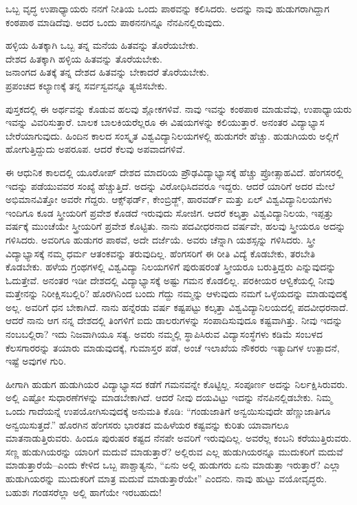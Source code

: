 ಒಬ್ಬ ವೃದ್ಧ ಉಪಾಧ್ಯಾಯರು ನನಗೆ ನೀತಿಯ ಒಂದು ಪಾಠವನ್ನು ಕಲಿಸಿದರು. ಅದನ್ನು ನಾವು ಹುಡುಗರಾಗಿದ್ದಾಗ ಕಂಠಪಾಠ ಮಾಡಿದೆವು. ಅದರ ಒಂದು ಪಾಠ\break ನನಗಿನ್ನೂ ನೆನಪಿನಲ್ಲಿರುವುದು.

\begin{myquote}
ಹಳ್ಳಿಯ ಹಿತಕ್ಕಾಗಿ ಒಬ್ಬ ತನ್ನ ಮನೆಯ ಹಿತವನ್ನು ತೊರೆಯಬೇಕು.\\ದೇಶದ ಹಿತಕ್ಕಾಗಿ ಹಳ್ಳಿಯ ಹಿತವನ್ನು ತೊರೆಯಬೇಕು.\\ಜನಾಂಗದ ಹಿತಕ್ಕೆ ತನ್ನ ದೇಶದ ಹಿತವನ್ನು ಬೇಕಾದರೆ ತೊರೆಯಬೇಕು.\\ಪ್ರಪಂಚದ ಕಲ್ಯಾಣಕ್ಕೆ ತನ್ನ ಸರ್ವಸ್ವವನ್ನೂ ತ್ಯಜಿಸಬೇಕು.
\end{myquote}

ಪುಸ್ತಕದಲ್ಲಿ ಈ ಅರ್ಥವನ್ನು ಕೊಡುವ ಹಲವು ಶ್ಲೋಕಗಳಿವೆ. ನಾವು ಇವನ್ನು ಕಂಠಪಾಠ ಮಾಡುವೆವು, ಉಪಾಧ್ಯಾಯರು ಇವನ್ನು ವಿವರಿಸುತ್ತಾರೆ. ಬಾಲಕ ಬಾಲಕಿಯರೆಲ್ಲರೂ ಈ ವಿಷಯಗಳನ್ನು ಕಲಿಯುತ್ತಾರೆ. ಅನಂತರ ವಿದ್ಯಾಭ್ಯಾಸ ಬೇರೆಯಾಗುವುದು. ಹಿಂದಿನ ಕಾಲದ ಸಂಸ್ಕೃತ ವಿಶ್ವವಿದ್ಯಾನಿಲಯಗಳಲ್ಲಿ ಹುಡುಗರೇ ಹೆಚ್ಚು. ಹುಡುಗಿಯರು ಅಲ್ಲಿಗೆ ಹೋಗುತ್ತಿದ್ದುದು ಅಪರೂಪ. ಆದರೆ ಕೆಲವು ಅಪವಾದಗಳಿವೆ.

ಈ ಆಧುನಿಕ ಕಾಲದಲ್ಲಿ ಯೂರೋಪ್​ ದೇಶದ ಮಾದರಿಯ ಪ್ರೌಢವಿದ್ಯಾಭ್ಯಾಸಕ್ಕೆ \break ಹೆಚ್ಚು ಪ್ರೋತ್ಸಾಹವಿದೆ. ಹೆಂಗಸರಲ್ಲಿ ಇದನ್ನು ಪಡೆಯುವವರ ಸಂಖ್ಯೆ ಹೆಚ್ಚುತ್ತಿದೆ. ಅದನ್ನು ವಿರೋಧಿಸಿದವರೂ ಇದ್ದರು. ಆದರೆ ಯಾರಿಗೆ ಅದರ ಮೇಲೆ ಅಭಿಮಾನವಿತ್ತೋ ಅವರೇ ಗೆದ್ದರು. ಆಕ್ಸ್​ಫರ್ಡ್​, ಕೇಂಬ್ರಿಡ್ಜ್​, ಹಾರವರ್ಡ್​ ಮತ್ತು ಏಲ್​ ವಿಶ್ವವಿದ್ಯಾನಿಲಯಗಳು ಇಂದಿಗೂ ಕೂಡ ಸ್ತ್ರೀಯರಿಗೆ ಪ್ರವೇಶ ಕೊಡದೆ ಇರುವುದು ಸೋಜಿಗ. ಆದರೆ ಕಲ್ಕತ್ತಾ ವಿಶ್ವವಿದ್ಯಾನಿಲಯ, ಇಪ್ಪತ್ತು ವರ್ಷಕ್ಕೆ ಮುಂಚೆಯೇ ಸ್ತ್ರೀಯರಿಗೆ ಪ್ರವೇಶ ಕೊಟ್ಟಿತು. ನಾನು ಪದವೀಧರನಾದ ವರ್ಷವೇ, ಹಲವು ಸ್ತ್ರೀಯರೂ ಅದನ್ನು ಗಳಿಸಿದರು. ಅವರಿಗೂ ಹುಡುಗರ ಪಾಠವೆ, ಅದೇ ದರ್ಜೆಯೆ. ಅವರು ಚೆನ್ನಾಗಿ ಯಶಸ್ಸನ್ನು ಗಳಿಸಿದರು. ಸ್ತ್ರೀ ವಿದ್ಯಾಭ್ಯಾಸಕ್ಕೆ ನಮ್ಮ ಧರ್ಮ ಆತಂಕವನ್ನು ತರುವುದಿಲ್ಲ. ಹೆಂಗಸರಿಗೆ ಈ ರೀತಿ ವಿದ್ಯೆ ಕೊಡಬೇಕು, ತರಬೇತಿ ಕೊಡಬೇಕು. ಹಳೆಯ ಗ್ರಂಥಗಳಲ್ಲಿ ವಿಶ್ವವಿದ್ಯಾ ನಿಲಯಗಳಿಗೆ ಪುರುಷರಂತೆ ಸ್ತ್ರೀಯರೂ ಬರುತ್ತಿದ್ದರು ಎನ್ನುವುದನ್ನು ಓದುತ್ತೇವೆ. ಅನಂತರ ಇಡೀ ದೇಶದಲ್ಲಿ ವಿದ್ಯಾಭ್ಯಾಸಕ್ಕೆ ಅಷ್ಟು ಗಮನ ಕೊಡಲಿಲ್ಲ. ಪರಕೀಯರ ಆಳ್ವಿಕೆಯಲ್ಲಿ ನೀವು ಮತ್ತೇನನ್ನು ನಿರೀಕ್ಷಿಸಬಲ್ಲಿರಿ? ಹೊರಗಿನಿಂದ ಬಂದು ಗೆದ್ದು ನಮ್ಮನ್ನು ಆಳುವುದು ನಮಗೆ ಒಳ್ಳೆಯದನ್ನು ಮಾಡುವುದಕ್ಕೆ ಅಲ್ಲ. ಅವರಿಗೆ ಧನ ಬೇಕಾಗಿದೆ. ನಾನು ಹನ್ನೆರಡು ವರ್ಷ ಕಷ್ಟಪಟ್ಟು ಕಲ್ಕತ್ತಾ ವಿಶ್ವವಿದ್ಯಾನಿಲಯದಲ್ಲಿ ಪದವೀಧರನಾದೆ. ಆದರೆ ನಾನು ಆಗ ನನ್ನ ದೇಶದಲ್ಲಿ ತಿಂಗಳಿಗೆ ಐದು ಡಾಲರುಗಳನ್ನು ಸಂಪಾದಿಸುವುದೂ ಕಷ್ಟವಾಗಿತ್ತು. ನೀವು ಇದನ್ನು ನಂಬಬಲ್ಲಿರಾ? ಇದು ನಿಜವಾಗಿಯೂ ಸತ್ಯ. ಅವರು ನಮ್ಮಲ್ಲಿ ಸ್ಥಾಪಿಸಿರುವ ವಿದ್ಯಾಸಂಸ್ಥೆಗಳು ಕಡಿಮೆ ಸಂಬಳದ ಕೆಲಸಗಾರರನ್ನು ತಯಾರು ಮಾಡುವುದಕ್ಕೆ, ಗುಮಾಸ್ತರ ಪಡೆ, ಅಂಚೆ ಇಲಾಖೆಯ ನೌಕರರು ಇತ್ಯಾದಿಗಳ ಉತ್ಪಾದನೆ, ಇಷ್ಟೆ ಅವುಗಳ ಗುರಿ.

ಹೀಗಾಗಿ ಹುಡುಗ ಹುಡುಗಿಯರ ವಿದ್ಯಾಭ್ಯಾಸದ ಕಡೆಗೆ ಗಮನವನ್ನೇ ಕೊಟ್ಟಿಲ್ಲ. ಸಂಪೂರ್ಣ ಅದನ್ನು ನಿರ್ಲಕ್ಷಿಸಿರುವರು. ಅಲ್ಲಿ ಎಷ್ಟೋ ಸುಧಾರಣೆಗಳನ್ನು ಮಾಡಬೇಕಾಗಿದೆ. ಆದರೆ ನೀವು ದಯವಿಟ್ಟು ಇದನ್ನು ನೆನಪಿನಲ್ಲಿಡಬೇಕು. ನಿಮ್ಮ ಒಂದು ಗಾದೆಯನ್ನೆ ಉಪಯೋಗಿಸುವುದಕ್ಕೆ ಅನುಮತಿ ಕೊಡಿ: “ಗಂಡುಜಾತಿಗೆ ಅನ್ವಯಿಸುವುದೇ ಹೆಣ್ಣುಜಾತಿಗೂ ಅನ್ವಯಿಸುತ್ತದೆ.” ಹೊರಗಿನ ಹೆಂಗಸರು ಭಾರತದ ಮಹಿಳೆಯರ ಕಷ್ಟವನ್ನು ಕುರಿತು ಯಾವಾಗಲೂ ಮಾತನಾಡುತ್ತಿರುವರು. ಹಿಂದೂ ಪುರುಷರ ಕಷ್ಟದ ನೆನಪೇ ಅವರಿಗೆ ಇರುವುದಿಲ್ಲ. ಅವರೆಲ್ಲ ಕಂಬನಿ ಕರೆಯುತ್ತಿರುವರು. ಸಣ್ಣ ಹುಡುಗಿಯರನ್ನು ಯಾರಿಗೆ ಮದುವೆ ಮಾಡುತ್ತಾರೆ? ಅಲ್ಲಿರುವ ಎಲ್ಲ ಹುಡುಗಿಯರನ್ನೂ ಮುದುಕರಿಗೆ ಮದುವೆ ಮಾಡುತ್ತಾರೆಯೆ–ಎಂದು ಕೇಳಿದ ಒಬ್ಬ ಪಾಶ್ಚಾತ್ಯನು, “ಏನು ಅಲ್ಲಿ ಹುಡುಗರು ಏನು ಮಾಡುತ್ತಾ ಇರುತ್ತಾರೆ? ಎಲ್ಲಾ ಹುಡುಗಿಯರನ್ನು ಮುದುಕರಿಗೆ ಮಾತ್ರ ಮದುವೆ ಮಾಡುತ್ತಾರೆಯೇ” ಎಂದನು. ನಾವು ಹುಟ್ಟು ವಯೋವೃದ್ಧರು. ಬಹುಶಃ ಗಂಡಸರೆಲ್ಲಾ ಅಲ್ಲಿ ಹಾಗೆಯೇ ಇರಬಹುದು!

